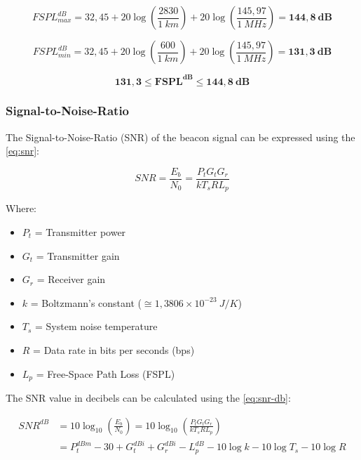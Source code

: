 \begin{equation}
FSPL^{dB}_{max} = 32,45 + 20\log\left(\frac{2830}{1\ km}\right) + 20\log\left(\frac{145,97}{1\ MHz}\right) = \mathbf{144,8\ dB}
\end{equation}

\begin{equation}
FSPL^{dB}_{min} = 32,45 + 20\log\left(\frac{600}{1\ km}\right) + 20\log\left(\frac{145,97}{1\ MHz}\right) = \mathbf{131,3\ dB}
\end{equation}

\begin{equation}
\mathbf{131,3 \leq FSPL^{dB} \leq 144,8\ dB}
\end{equation}

\subsubsection{Signal-to-Noise-Ratio}

The Signal-to-Noise-Ratio (SNR) of the beacon signal can be expressed using the \autoref{eq:snr}:

\begin{equation} \label{eq:snr}
SNR = \frac{E_{b}}{N_{0}} = \frac{P_{t}G_{t}G_{r}}{kT_{s}RL_{p}}
\end{equation}

Where:

\begin{itemize}
    \item $P_{t}$ = Transmitter power
    \item $G_{t}$ = Transmitter gain
    \item $G_{r}$ = Receiver gain
    \item $k$ = Boltzmann's constant ($\cong 1,3806 \times 10^{-23}\ J/K$)
    \item $T_{s}$ = System noise temperature
    \item $R$ = Data rate in bits per seconds (bps)
    \item $L_{p}$ = Free-Space Path Loss (FSPL)
\end{itemize}

The SNR value in decibels can be calculated using the \autoref{eq:snr-db}:

\begin{equation} \label{eq:snr-db}
    \begin{split}
        SNR^{dB} & = 10\log_{10}\left( \frac{E_{b}}{N_{0}} \right) = 10\log_{10} \left( \frac{P_{t}G_{t}G_{r}}{kT_{s}RL_{p}} \right) \\
                 & = P_{t}^{dBm} - 30 + G_{t}^{dBi} + G_{r}^{dBi} - L_{p}^{dB} - 10\log k - 10\log T_{s} - 10\log R
    \end{split}
\end{equation}

